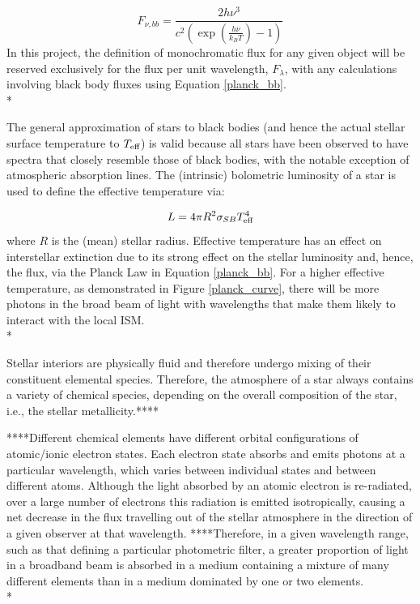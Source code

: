 \documentclass[12pt, a4paper]{report}
\begin{document}
\begin{equation}
F_{\nu,bb} = \frac{2h\nu^{3}}{c^{2}\left(\exp\left({\frac{h\nu}{k_{B}T}}\right) - 1\right)}
\label{planck_bb_freq}
\end{equation}
In this project, the definition of monochromatic flux for any given object will be reserved exclusively for the flux per unit wavelength, $F_{\lambda}$, with any calculations involving black body fluxes using Equation \ref{planck_bb}. \\*

The general approximation of stars to black bodies (and hence the actual stellar surface temperature to $T_{\textnormal{eff}}$) is valid because all stars have been observed to have spectra that closely resemble those of black bodies, with the notable exception of atmospheric absorption lines. The (intrinsic) bolometric luminosity of a star is used to define the effective temperature via:

\begin{equation}
L = 4 \pi R^{2} \sigma_{SB} T_{\textnormal{eff}}^{4}
\label{Teff_def}
\end{equation}
where $R$ is the (mean) stellar radius. Effective temperature has an effect on interstellar extinction due to its strong effect on the stellar luminosity and, hence, the flux, via the Planck Law in Equation \ref{planck_bb}. For a higher effective temperature, as demonstrated in Figure \ref{planck_curve}, there will be more photons in the broad beam of light with wavelengths that make them likely to interact with the local ISM. \\*

Stellar interiors are physically fluid and therefore undergo mixing of their constituent elemental species. Therefore, the atmosphere of a star always contains a variety of chemical species, depending on the overall composition of the star, i.e., the stellar metallicity.****

****Different chemical elements have different orbital configurations of atomic/ionic electron states. Each electron state absorbs and emits photons at a particular wavelength, which varies between individual states and between different atoms. Although the light absorbed by an atomic electron is re-radiated, over a large number of electrons this radiation is emitted isotropically, causing a net decrease in the flux travelling out of the stellar atmosphere in the direction of a given observer at that wavelength. ****Therefore, in a given wavelength range, such as that defining a particular photometric filter, a greater proportion of light in a broadband beam is absorbed in a medium containing a mixture of many different elements than in a medium dominated by one or two elements.\\*
\end{document}
